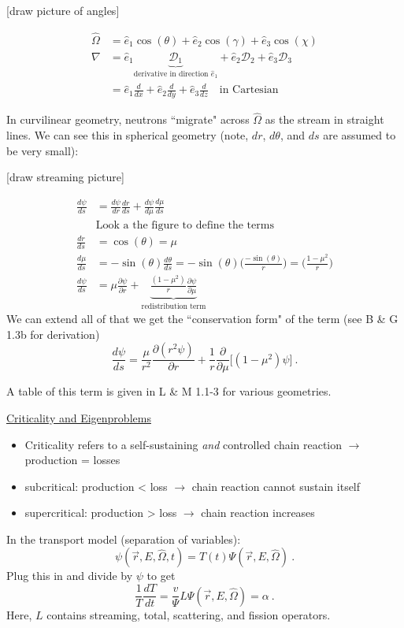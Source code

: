 \documentclass[12pt]{article}
\newcommand{\rvec}{\ensuremath{\vec{r}}}
\newcommand{\vOmega}{\ensuremath{\hat{\Omega}}}
\begin{document}
[draw picture of angles]

\begin{align*}
\vOmega &= \hat{e}_1 \cos(\theta) + \hat{e}_2 \cos(\gamma) + \hat{e}_3 \cos(\chi) \\
\nabla &= \hat{e}_1 \underbrace{\mathcal{D}_1}_{\text{derivative in direction }\hat{e}_1} + \hat{e}_2 \mathcal{D}_2 + \hat{e}_3 \mathcal{D}_3\\
&= \hat{e}_1 \frac{d}{dx} + \hat{e}_2 \frac{d}{dy} + \hat{e}_3 \frac{d}{dz} \quad \text{in Cartesian}
\end{align*}

In curvilinear geometry, neutrons ``migrate" across $\vOmega$ as the stream in straight lines. 
We can see this in spherical geometry (note, $dr$, $d\theta$, and $ds$ are assumed to be very small):

[draw streaming picture]

\begin{align*}
\frac{d \psi}{ds} &= \frac{d \psi}{dr} \frac{dr}{ds} + \frac{d\psi}{d\mu} \frac{d\mu}{ds} \\
&\text{Look a the figure to define the terms}\\
\frac{dr}{ds} &= \cos(\theta) = \mu \\
%
\frac{d \mu}{ds} &= -\sin(\theta) \frac{d \theta}{ds} = -\sin(\theta) \biggl(\frac{-\sin(\theta)}{r} \biggr) = \biggl(\frac{1 - \mu^2}{r} \biggr) \\
%
\frac{d\psi}{ds} &= \mu \frac{\partial \psi}{\partial r} + \underbrace{\frac{(1 - \mu^2)}{r}\frac{\partial \psi}{\partial \mu}}_{\text{redistribution term}}
\end{align*}
%
We can extend all of that we get the ``conservation form" of the term (see B \& G 1.3b for derivation)
\[\frac{d\psi}{ds} = \frac{\mu}{r^2} \frac{\partial(r^2 \psi)}{\partial r} + \frac{1}{r} \frac{\partial}{\partial \mu}\bigl[(1 - \mu^2) \psi \bigr] \:. \]

A table of this term is given in L \& M 1.1-3 for various geometries.

\underline{Criticality and Eigenproblems}
\begin{itemize}
\item Criticality refers to a self-sustaining \textit{and} controlled chain reaction $\rightarrow$ production = losses
\item subcritical: production < loss $\rightarrow$ chain reaction cannot sustain itself
\item supercritical: production > loss $\rightarrow$ chain reaction increases 
\end{itemize}
%
In the transport model (separation of variables):
\[\psi(\rvec, E, \vOmega, t) = T(t) \Psi(\rvec, E, \vOmega) \:.\]
Plug this in and divide by $\psi$ to get
\[\frac{1}{T}\frac{dT}{dt} = \frac{v}{\Psi} L \Psi(\rvec, E, \vOmega) = \alpha \:.\]
%
Here, $L$ contains streaming, total, scattering, and fission operators.
\end{document}
